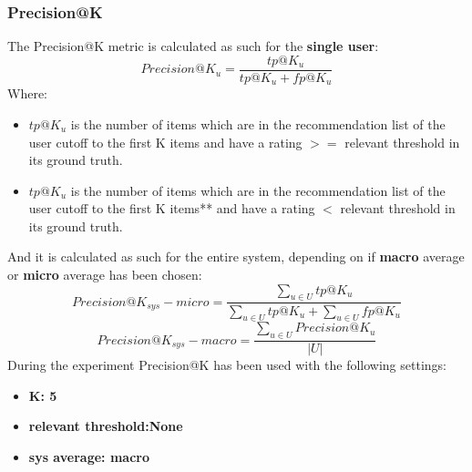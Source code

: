 \documentclass[11pt]{article}
\begin{document}
\subsubsection{Precision@K}\label{subsubsec:prec-k}
The Precision@K metric is calculated as such for the \textbf{single user}:
\hfill\break
\hfill\break
    \[
        Precision@K_u = \frac{tp@K_u}{tp@K_u + fp@K_u}
    \]
\hfill\break
\hfill\break
    Where:
\begin{itemize}
    \item $tp@K_u$ is the number of items which are in the recommendation list of the user
      cutoff to the first K items and have a rating $>=$ relevant threshold in its ground truth.
    \item $tp@K_u$ is the number of items which are in the recommendation list of the user
      cutoff to the first K items** and have a rating $<$ relevant threshold in its ground truth.
\end{itemize}
\hfill\break
\hfill\break
And it is calculated as such for the entire system, depending on if \textbf{macro} average or \textbf{micro} average
has been chosen:
\hfill\break
\hfill\break
   \[
       Precision@K_{sys} - micro = \frac{\sum_{u \in U} tp@K_u}{\sum_{u \in U} tp@K_u + \sum_{u \in U} fp@K_u}
   \]
\hfill\break
\hfill\break
    \[
       Precision@K_{sys} - macro = \frac{\sum_{u \in U} Precision@K_u}{|U|}
   \]
\hfill\break
\hfill\break
During the experiment Precision@K has been used with the following settings:
\begin{itemize}
    \item \textbf{K: 5 }
    \item \textbf{relevant threshold:None }
    \item \textbf{sys average: macro }
\end{itemize}
\hfill\break
\hfill\break

\end{document}
